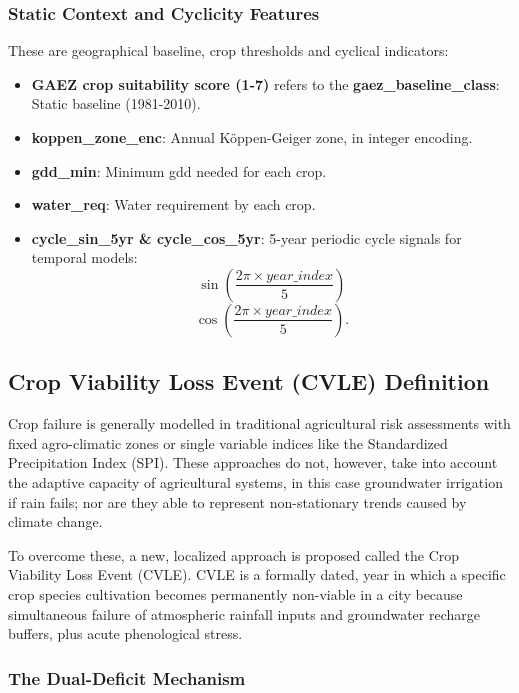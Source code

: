 \documentclass{ieeeaccess}
\begin{document}
\subsubsection{Static Context and Cyclicity Features}

These are geographical baseline, crop thresholds and cyclical indicators:

\begin{itemize}
    \item \textbf{GAEZ crop suitability score (1-7)} refers to the \textbf{gaez\_baseline\_class}: Static baseline (1981-2010).

    \item \textbf{koppen\_zone\_enc}: Annual Köppen-Geiger zone, in integer encoding.

    \item \textbf{gdd\_min}: Minimum gdd needed for each crop.

    \item \textbf{water\_req}: Water requirement by each crop.

    \item \textbf{cycle\_sin\_5yr \& cycle\_cos\_5yr}: 5-year periodic cycle signals for temporal models:
    \[
    \sin\left(\frac{2\pi \times year\_index}{5}\right)
    \]
    \[
    \cos\left(\frac{2\pi \times year\_index}{5}\right).
    \]
\end{itemize}

\subsection{Crop Viability Loss Event (CVLE) Definition}

Crop failure is generally modelled in traditional agricultural risk assessments with fixed agro-climatic zones or single variable indices like the Standardized Precipitation Index (SPI). These approaches do not, however, take into account the adaptive capacity of agricultural systems, in this case groundwater irrigation if rain fails; nor are they able to represent non-stationary trends caused by climate change.

To overcome these, a new, localized approach is proposed called the Crop Viability Loss Event (CVLE). CVLE is a formally dated, year in which a specific crop species cultivation becomes permanently non-viable in a city because simultaneous failure of atmospheric rainfall inputs and groundwater recharge buffers, plus acute phenological stress.

\subsubsection{The Dual-Deficit Mechanism}
\end{document}

